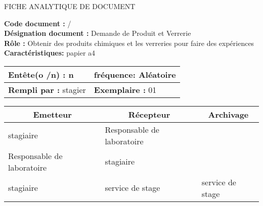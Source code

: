 

\newpage

\begin{center}
\Huge FICHE ANALYTIQUE DE DOCUMENT
\end{center}

\vspace{0.5cm}
    

\begin{flushleft}
\textbf{Code document :} / \\
\textbf{Désignation document :} Demande de Produit et Verrerie \\
\textbf{Rôle :} Obtenir des produits chimiques et les verreries pour faire des expériences \\
\textbf{Caractéristiques:} papier a4 \\
\end{flushleft}

\vspace{1cm}

\begin{table}[ht]
\begin{tabularx}{\textwidth}{|X|X|}

\hline
\textbf{Entête(o /n) :}   n  & \textbf{fréquence:} Aléatoire  \\
\hline
\textbf{Rempli par :}  stagier    & \textbf{Exemplaire :} 01  \\
\hline
\end{tabularx}
\end{table}

\vspace{1cm}

\begin{table}[ht]
\begin{tabularx}{\textwidth}{|X|X|X|}
  \hline
  \multicolumn{1}{|c|}{\centering\textbf{Emetteur}} & \multicolumn{1}{c|}{\centering\textbf{Récepteur}} & \multicolumn{1}{c|}{\centering\textbf{Archivage}} \\
  \hline
  stagiaire& Responsable de laboratoire &  \\
  Responsable de laboratoire & stagiaire &  \\
  stagiaire & service de stage  & service de stage \\
  \hline
\end{tabularx}
\end{table}

\vspace{1cm}


